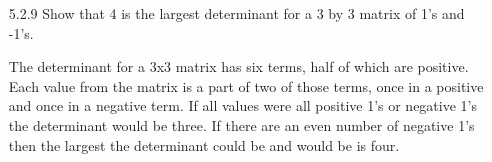 \documentclass[10pt,twoside,reqno]{article}
\begin{document}
\begin{enumerate}
\item[5.2.9] Show that 4 is the largest determinant for a 3 by 3 matrix of 1's and -1's. \\
\vspace{3mm}

The determinant for a 3x3 matrix has six terms, half of which are positive. Each value from the matrix is a part of two of those terms, once in a positive and once in a negative term. If all values were all positive 1's or negative 1's the determinant would be three. If there are an even number of negative 1's then the largest the determinant could be and would be is four.

\vspace{3mm}


\end{enumerate}
\end{document}
